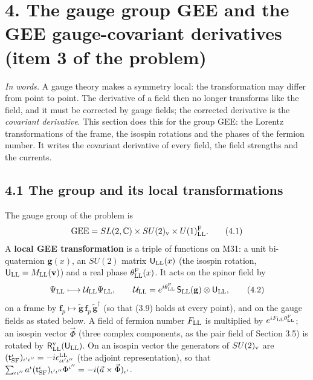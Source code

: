 \documentclass[
  10pt,
]{article}
\begin{document}
\hypertarget{the-gauge-group-gee-and-the-gee-gauge-covariant-derivatives-item-3-of-the-problem}{%
\section{4. The gauge group GEE and the GEE gauge-covariant derivatives
(item 3 of the
problem)}\label{the-gauge-group-gee-and-the-gee-gauge-covariant-derivatives-item-3-of-the-problem}}

\emph{In words.} A gauge theory makes a symmetry local: the
transformation may differ from point to point. The derivative of a field
then no longer transforms like the field, and it must be corrected by
gauge fields; the corrected derivative is the \emph{covariant
derivative}. This section does this for the group GEE: the Lorentz
transformations of the frame, the isospin rotations and the phases of
the fermion number. It writes the covariant derivative of every field,
the field strengths and the currents.

\hypertarget{the-group-and-its-local-transformations}{%
\subsection{4.1 The group and its local
transformations}\label{the-group-and-its-local-transformations}}

The gauge group of the problem is
\[\mathrm{GEE}=SL(2,\mathbb C)\times SU(2)_{\rm v}\times U(1)^{\rm F}_{\rm LL}.\tag{4.1}\]
A \textbf{local GEE transformation} is a triple of functions on M31: a
unit bi-quaternion \(\mathbf g(x)\), an \(SU(2)\) matrix
\(\mathsf U_{\rm LL}(x)\) (the isospin rotation,
\(\mathsf U_{\rm LL}=M_{\rm LL}(\mathbf v)\)) and a real phase
\(\theta^{\rm F}_{\rm LL}(x)\). It acts on the spinor field by
\[\Psi_{\rm LL}\longmapsto\mathcal U_{\rm LL}\Psi_{\rm LL},\qquad\mathcal U_{\rm LL}=e^{i\theta^{\rm F}_{\rm LL}}\,\mathsf S_{\rm LL}(\mathbf g)\otimes\mathsf U_{\rm LL},\tag{4.2}\]
on a frame by
\(\mathbf f_p\mapsto\tilde{\mathbf g}\,\mathbf f_p\,\tilde{\mathbf g}^\dagger\)
(so that (3.9) holds at every point), and on the gauge fields as stated
below. A field of fermion number \(F_{\rm LL}\) is multiplied by
\(e^{iF_{\rm LL}\theta^{\rm F}_{\rm LL}}\); an isospin vector
\(\vec\Phi\) (three complex components, as the pair field of Section
3.5) is rotated by \(\mathsf R^{\rm v}_{\rm LL}(\mathsf U_{\rm LL})\).
On an isospin vector the generators of \(SU(2)_{\rm v}\) are
\((\mathsf t^\iota_{\rm SF})_{\iota'\iota''}=-i\epsilon^{\rm LL}_{\iota\iota'\iota''}\)
(the adjoint representation), so that
\(\sum_{\iota\iota''}a^\iota(\mathsf t^\iota_{\rm SF})_{\iota'\iota''}\Phi^{\iota''}=-i(\vec a\times\vec\Phi)_{\iota'}\).
\end{document}
